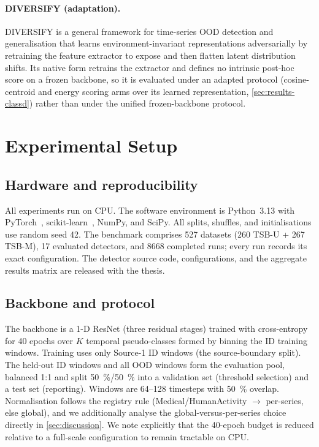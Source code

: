 \documentclass[11pt]{article}
\begin{document}
\paragraph{DIVERSIFY (adaptation).}
DIVERSIFY \citep{Lu2024} is a general framework for time-series OOD detection and
generalisation that learns environment-invariant representations adversarially by
retraining the feature extractor to expose and then flatten latent distribution
shifts. Its native form retrains the extractor and defines no intrinsic post-hoc
score on a frozen backbone, so it is evaluated under an adapted protocol
(cosine-centroid and energy scoring arms over its learned representation,
\cref{sec:results-classd}) rather than under the unified frozen-backbone protocol.

\section{Experimental Setup}\label{sec:setup}

\subsection{Hardware and reproducibility}
All experiments run on CPU. The software environment is Python~3.13 with
PyTorch~\citep{Paszke2019}, scikit-learn~\citep{Pedregosa2011}, NumPy, and SciPy. All
splits, shuffles, and initialisations use random seed \num{42}. The benchmark
comprises \num{527} datasets (\num{260} TSB-U + \num{267} TSB-M), \num{17} evaluated
detectors, and \num{8668} completed runs; every run records its exact configuration. The detector source code, configurations, and the
aggregate results matrix are released with the thesis.

\subsection{Backbone and protocol}
The backbone is a 1-D ResNet (three residual stages) trained with cross-entropy for
\num{40} epochs over $K$ temporal pseudo-classes formed by binning the ID training
windows. Training uses only Source-1 ID windows (the source-boundary split). The
held-out ID windows and all OOD windows form the evaluation pool, balanced 1:1 and
split \SI{50}{\percent}/\SI{50}{\percent} into a validation set (threshold selection)
and a test set (reporting). Windows are \numrange{64}{128} timesteps with
\SI{50}{\percent} overlap. Normalisation follows the registry rule
(Medical/HumanActivity $\to$ per-series, else global), and we additionally analyse
the global-versus-per-series choice directly in \cref{sec:discussion}. We note
explicitly that the \num{40}-epoch budget is reduced relative to a full-scale
configuration to remain tractable on CPU.
\end{document}
